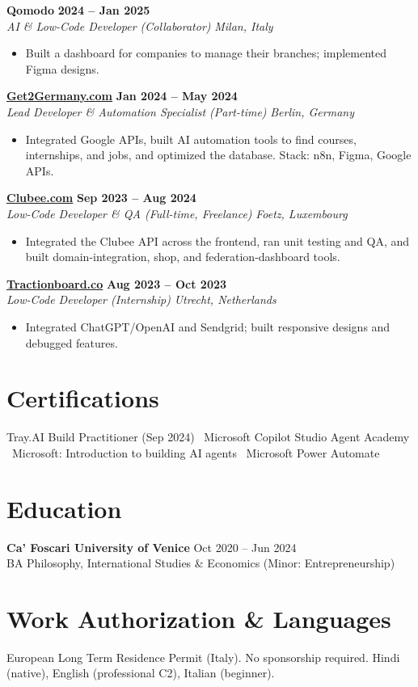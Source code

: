 \documentclass[a4paper,10pt]{article}
\newcommand{\role}[4]{%
 \textbf{#1} \hfill \textbf{#2}\\[1pt]%
 \textit{#3} \hfill \textit{#4}\\[2pt]%
}
\begin{document}
\role{Qomodo}{2024 -- Jan 2025}{AI \& Low-Code Developer (Collaborator)}{Milan, Italy}
\begin{itemize}
 \item Built a dashboard for companies to manage their branches; implemented Figma designs.
\end{itemize}

\role{\href{https://get2germany.com}{Get2Germany.com}}{Jan 2024 -- May 2024}{Lead Developer \& Automation Specialist (Part-time)}{Berlin, Germany}
\begin{itemize}
 \item Integrated Google APIs, built AI automation tools to find courses, internships, and jobs, and optimized the database. Stack: n8n, Figma, Google APIs.
\end{itemize}

\role{\href{https://clubee.com}{Clubee.com}}{Sep 2023 -- Aug 2024}{Low-Code Developer \& QA (Full-time, Freelance)}{Foetz, Luxembourg}
\begin{itemize}
 \item Integrated the Clubee API across the frontend, ran unit testing and QA, and built domain-integration, shop, and federation-dashboard tools.
\end{itemize}

\role{\href{https://tractionboard.co}{Tractionboard.co}}{Aug 2023 -- Oct 2023}{Low-Code Developer (Internship)}{Utrecht, Netherlands}
\begin{itemize}
 \item Integrated ChatGPT/OpenAI and Sendgrid; built responsive designs and debugged features.
\end{itemize}

\section{Certifications}
Tray.AI Build Practitioner (Sep 2024) \textbullet\ Microsoft Copilot Studio Agent Academy \textbullet\ Microsoft: Introduction to building AI agents \textbullet\ Microsoft Power Automate

\section{Education}
\textbf{Ca' Foscari University of Venice} \hfill Oct 2020 -- Jun 2024\\
BA Philosophy, International Studies \& Economics (Minor: Entrepreneurship)

\section{Work Authorization \& Languages}
European Long Term Residence Permit (Italy). No sponsorship required. Hindi (native), English (professional C2), Italian (beginner).
\end{document}

